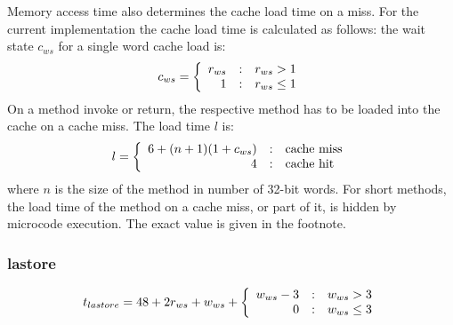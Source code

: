 %

Memory access time also determines the cache load time on a miss. For
the current implementation the cache load time is calculated as
follows: the wait state $c_{ws}$ for a single word cache load is:
\begin{equation*}
    c_{ws} =
    \left\{\begin{array}{r@{\quad:\quad}l}
    r_{ws} & r_{ws}>1 \\
    1   & r_{ws}\le1
    \end{array} \right.
\end{equation*}
%
On a method invoke or return, the respective method has to be loaded
into the cache on a cache miss. The load time $l$ is:
\[
    l =
    \left\{\begin{array}{r@{\quad:\quad}l}
    6+(n+1)(1+c_{ws}) & \mbox{cache miss} \\
    4   & \mbox{cache hit}
    \end{array} \right.
\]
where $n$ is the size of the method in number of 32-bit words. For
short methods, the load time of the method on a cache miss, or part
of it, is hidden by microcode execution. The exact value is given in
the footnote.

\subsubsection*{lastore}

\begin{equation*}
    t_{lastore} = 48+2r_{ws}+w_{ws} + \left\{\begin{array}{r@{\quad:\quad}l}
    w_{ws}-3 & w_{ws}>3 \\
    0   & w_{ws}\le3
    \end{array} \right.
\end{equation*}

%
%

%
